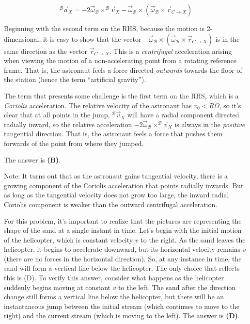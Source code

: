 \documentclass[12pt]{article}
\begin{document}
$$^\mathcal{B} \vec{a}_X = -2 \vec{\omega}_\mathcal{B} \times ^\mathcal{B} \vec{v}_X - \vec{\omega}_\mathcal{B} \times (\vec{\omega}_\mathcal{B} \times \vec{r}_{C \to X})$$

Beginning with the second term on the RHS, because the motion is 2-dimensional, it is easy to show that the vector $-\vec{\omega}_\mathcal{B} \times (\vec{\omega}_\mathcal{B} \times \vec{r}_{C \to X})$ is in the same direction as the vector $\vec{r}_{C \to X}$. This is a \textit{centrifugal} acceleration arising when viewing the motion of a non-accelerating point from a rotating reference frame. That is, the astronaut feels a force directed \textit{outwards} towards the floor of the station (hence the term ``artificial gravity'').

The term that presents some challenge is the first term on the RHS, which is a \textit{Coriolis} acceleration. The relative velocity of the astronaut has $v_0 < R \Omega$, so it's clear that at all points in the jump, $^\mathcal{B} \vec{v}_X$ will have a radial component directed radially inward, so the relative acceleration $-2 \vec{\omega}_\mathcal{B} \times ^\mathcal{B} \vec{v}_X$ is always in the \textit{positive} tangential direction. That is, the astronaut feels a force that pushes them forwards of the point from where they jumped.

The answer is \textbf{(B)}.

Note: It turns out that as the astronaut gains tangential velocity, there is a growing component of the Coriolis acceleration that points radially inwards. But as long as the tangential velocity does not grow too large, the inward radial Coriolis component is weaker than the outward centrifugal acceleration.


\vspace{2 \baselineskip}



For this problem, it's important to realize that the pictures are representing the shape of the sand at a single instant in time. Let's begin with the initial motion of the helicopter, which is constant velocity $v$ to the right. As the sand leaves the helicopter, it begins to accelerate downward, but its horizontal velocity remains $v$ (there are no forces in the horizontal direction). So, at any instance in time, the sand will form a vertical line below the helicopter. The only choice that reflects this is (D). To verify this answer, consider what happens as the helicopter suddenly begins moving at constant $v$ to the left. The sand after the direction change still forms a vertical line below the helicopter, but there will be an instantaneous jump between the initial stream (which continues to move to the right) and the current stream (which is moving to the left). The answer is \textbf{(D)}.
\end{document}
